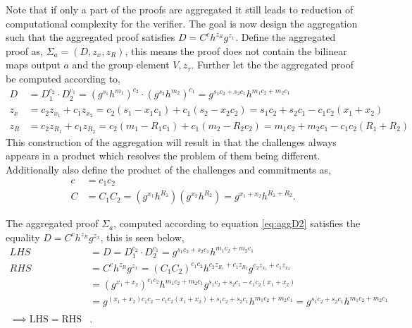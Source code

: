 Note that if only a part of the proofs are aggregated it still leads to reduction of computational complexity for the verifier. The goal is now design the aggregation such that the aggregated proof satisfies $D = C^ch^{z_R}g^{z_x}$. 
Define the aggregated proof as, $\Sigma_a=(D,z_x,z_R)$, this means the proof does not contain the bilinear maps output $a$ and the group element $V, z_{\tau}$. Further let the the aggregated proof be computed according to, 
\begin{equation}
\label{eq:aggD2}
\begin{aligned}
D &= D_1^{c_2}\cdot D_2^{c_1} = (g^{s_1}h^{m_1}) ^{c_2} \cdot (g^{s_2}h^{m_2}) ^{c_1}  =g^{s_1c_2+s_2c_1}h^{m_1c_2+m_2c_1} \\
z_x &= c_2z_{x_1} +c_1 z_{x_2} = c_2(s_1-x_1c_1)  + c_1(s_2-x_2c_2) = s_1c_2 + s_2c_1 -c_1c_2(x_1+x_2)\\
z_R &= c_2z_{R_1} +c_1 z_{R_2} = c_2(m_1-R_1c_1)  + c_1(m_2-R_2c_2) = m_1c_2 + m_2c_1 -c_1c_2(R_1+R_2)
\end{aligned}
\end{equation}
This construction of the aggregation will result in that the challenges always appears in a product which resolves the problem of them being different. Additionally also define the product of the challenges and commitments as,
\begin{align*}
c &= c_1c_2 \\
C &= C_1C_2 = (g^{x_1}h^{R_1}) (g^{x_2}h^{R_2}) = g^{x_1+x_2}h^{R_1+R_2}.
\end{align*}


The aggregated proof $\Sigma_a$, computed according to equation \eqref{eq:aggD2} satisfies the equality $D= C^ch^{z_R}g^{z_x}$, this is seen below,
\begin{align*}
LHS &= D = D_1^{c_2}\cdot D_2^{c_1} =g^{s_1c_2+s_2c_1}h^{m_1c_2+m_2c_1} \\
RHS &= C^ch^{z_R}g^{z_x} = (C_1C_2)^{c_1c_2}h^{c_2z_{R_1}+c_1z_{R_2}}g^{c_2z_{x_1}+c_1z_{x_2}}\\ 
&=(g^{x_1 + x_2})^{c_1c_2} h^{m_1c_2 +m_2c_1} g^{s_1c_2+ s_2c_1- c_1c_2(x_1+x_2)}  \\
&= g^{(x_1+x_2)c_1c_2 - c_1c_2(x_1+x_2) +s_1c_2+s_2c_1} h^{m_1c_2 +m_2c_1} = g^{s_1c_2+s_2c_1} h^{m_1c_2 +m_2c_1} \\
\\ \implies \text{LHS} =\text{RHS}&.
\end{align*}

